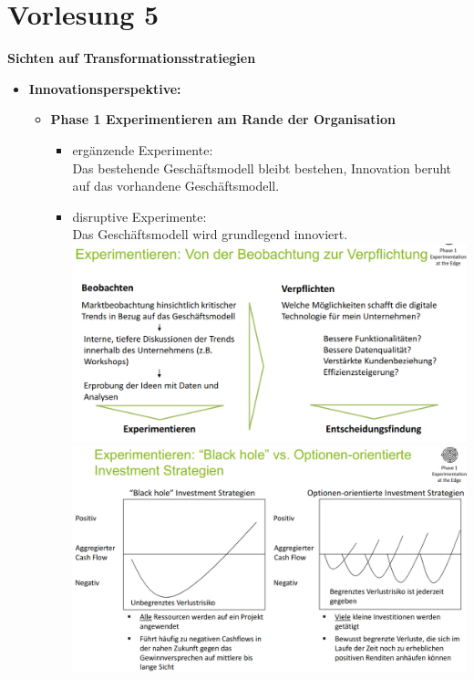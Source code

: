 \documentclass[a4]{scrartcl}
\begin{document}
\section*{Vorlesung 5}

\textbf{Sichten auf Transformationsstratiegien}
\begin{itemize}
\item \textbf{Innovationsperspektive:}

\begin{itemize}
\item \textbf{Phase 1 Experimentieren am Rande der Organisation}

\begin{itemize}
\item ergänzende Experimente: \\
Das bestehende Geschäftsmodell bleibt bestehen, Innovation beruht auf das vorhandene Geschäftsmodell.
\item disruptive Experimente: \\
Das Geschäftsmodell wird grundlegend innoviert. \\

\hspace*{0.8em} \includegraphics[scale=0.25]{experiment.png} \\


\includegraphics[scale=0.22]{bh.png}


\end{itemize}
\end{itemize}
\end{itemize}
\end{document}
